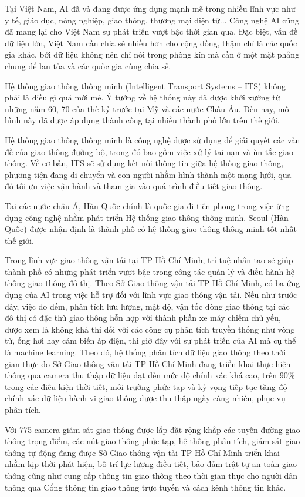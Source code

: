 \documentclass[14pt,oneside,a4paper]{extreport}
\begin{document}
Tại Việt Nam, AI đã và đang được ứng dụng mạnh mẽ trong nhiều lĩnh vực như y tế, giáo dục, nông nghiệp, giao thông, thương mại điện tử... Công nghệ AI cũng đã mang lại cho Việt Nam sự phát triển vượt bậc thời gian qua. Đặc biệt, vấn đề dữ liệu lớn, Việt Nam cần chia sẻ nhiều hơn cho cộng đồng, thậm chí là các quốc gia khác, bởi dữ liệu không nên chỉ nói trong phòng kín mà cần ở một mặt phẳng chung để lan tỏa và các quốc gia cùng chia sẻ.

Hệ thống giao thông thông minh (Intelligent Transport Systems – ITS) không phải là điều gì quá mới mẻ. Ý tưởng về hệ thống này đã được khởi xướng từ những năm 60, 70 của thế kỷ trước tại Mỹ và các nước Châu Âu. Đến nay, mô hình này đã được áp dụng thành công tại nhiều thành phố lớn trên thế giới.

Hệ thống giao thông thông minh là công nghệ được sử dụng để giải quyết các vấn đề của giao thông đường bộ, trong đó bao gồm việc xử lý tai nạn và ùn tắc giao thông. Về cơ bản, ITS sẽ sử dụng kết nối thông tin giữa hệ thống giao thông, phương tiện đang di chuyển và con người nhằm hình thành một mạng lưới, qua đó tối ưu việc vận hành và tham gia vào quá trình điều tiết giao thông.

Tại các nước châu Á, Hàn Quốc chính là quốc gia đi tiên phong trong việc ứng dụng công nghệ nhằm phát triển Hệ thống giao thông thông minh. Seoul (Hàn Quốc) được nhận định là thành phố có hệ thống giao thông thông minh tốt nhất thế giới.

Trong lĩnh vực giao thông vận tải tại TP Hồ Chí Minh, trí tuệ nhân tạo sẽ giúp thành phố có những phát triển vượt bậc trong công tác quản lý và điều hành hệ thống giao thông đô thị. Theo Sở Giao thông vận tải TP Hồ Chí Minh, có ba ứng dụng của AI trong việc hỗ trợ đối với lĩnh vực giao thông vận tải. Nếu như trước đây, việc đo đếm, phân tích lưu lượng, mật độ, vận tốc dòng giao thông tại các đô thị có đặc thù giao thông hỗn hợp với thành phần xe máy chiếm chủ yếu, được xem là không khả thi đối với các công cụ phân tích truyền thống như vòng từ, ống hơi hay cảm biến áp điện, thì giờ đây với sự phát triển của AI mà cụ thể là machine learning. Theo đó, hệ thống phân tích dữ liệu giao thông theo thời gian thực do Sở Giao thông vận tải TP Hồ Chí Minh đang triển khai thực hiện thông qua camera thu thập dữ liệu đạt đến mức độ chính xác khá cao, trên 90\% trong các điều kiện thời tiết, môi trường phức tạp và kỳ vọng tiếp tục tăng độ chính xác dữ liệu hành vi giao thông được thu thập ngày càng nhiều, phục vụ phân tích.

Với 775 camera giám sát giao thông được lắp đặt rộng khắp các tuyến đường giao thông trọng điểm, các nút giao thông phức tạp, hệ thống phân tích, giám sát giao thông tự động đang được Sở Giao thông vận tải TP Hồ Chí Minh triển khai nhằm kịp thời phát hiện, bố trí lực lượng điều tiết, bảo đảm trật tự an toàn giao thông cũng như cung cấp thông tin giao thông theo thời gian thực cho người dân thông qua Cổng thông tin giao thông trực tuyến và cách kênh thông tin khác.
\end{document}
